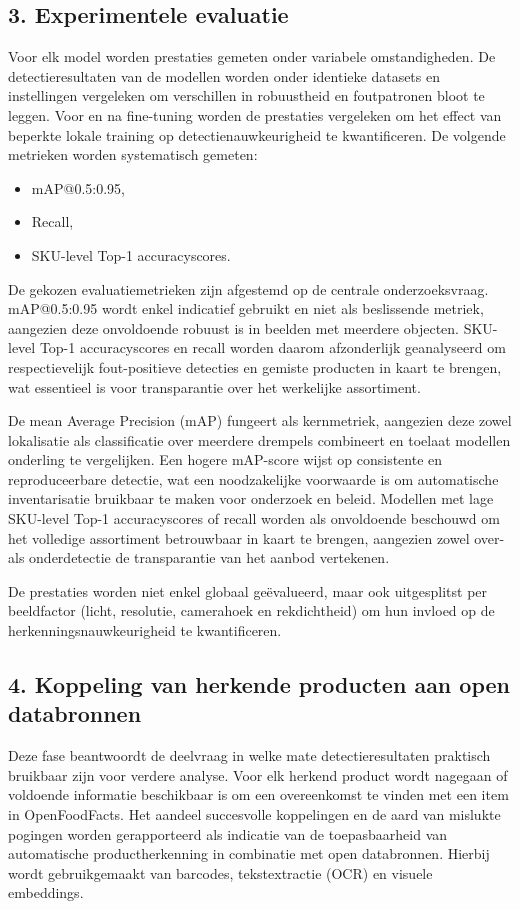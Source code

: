 \subsection*{3. Experimentele evaluatie}
Voor elk model worden prestaties gemeten onder variabele omstandigheden. De detectieresultaten van de modellen worden onder identieke datasets en instellingen vergeleken om verschillen in robuustheid en foutpatronen bloot te leggen. Voor en na fine-tuning worden de prestaties vergeleken om het effect van beperkte lokale training op detectienauwkeurigheid te kwantificeren. De volgende metrieken worden systematisch gemeten:
\begin{itemize}
    \item mAP@0.5:0.95,
    \item Recall,
    \item SKU-level Top-1 accuracyscores.
\end{itemize}
De gekozen evaluatiemetrieken zijn afgestemd op de centrale onderzoeksvraag. mAP@0.5:0.95 wordt enkel indicatief gebruikt en niet als beslissende metriek, aangezien deze onvoldoende robuust is in beelden met meerdere objecten. SKU-level Top-1 accuracyscores en recall worden daarom afzonderlijk geanalyseerd om respectievelijk fout-positieve detecties en gemiste producten in kaart te brengen, wat essentieel is voor transparantie over het werkelijke assortiment.

De mean Average Precision (mAP) fungeert als kernmetriek, aangezien deze zowel lokalisatie als classificatie over meerdere drempels combineert en toelaat modellen onderling te vergelijken. Een hogere mAP-score wijst op consistente en reproduceerbare detectie, wat een noodzakelijke voorwaarde is om automatische inventarisatie bruikbaar te maken voor onderzoek en beleid.
Modellen met lage SKU-level Top-1 accuracyscores of recall worden als onvoldoende beschouwd om het volledige assortiment betrouwbaar in kaart te brengen, aangezien zowel over- als onderdetectie de transparantie van het aanbod vertekenen.

De prestaties worden niet enkel globaal geëvalueerd, maar ook uitgesplitst per beeldfactor (licht, resolutie, camerahoek en rekdichtheid) om hun invloed op de herkenningsnauwkeurigheid te kwantificeren.

\subsection*{4. Koppeling van herkende producten aan open databronnen}
Deze fase beantwoordt de deelvraag in welke mate detectieresultaten praktisch bruikbaar zijn voor verdere analyse. Voor elk herkend product wordt nagegaan of voldoende informatie beschikbaar is om een overeenkomst te vinden met een item in OpenFoodFacts. Het aandeel succesvolle koppelingen en de aard van mislukte pogingen worden gerapporteerd als indicatie van de toepasbaarheid van automatische productherkenning in combinatie met open databronnen.
Hierbij wordt gebruikgemaakt van barcodes, tekstextractie (OCR) en visuele embeddings.

